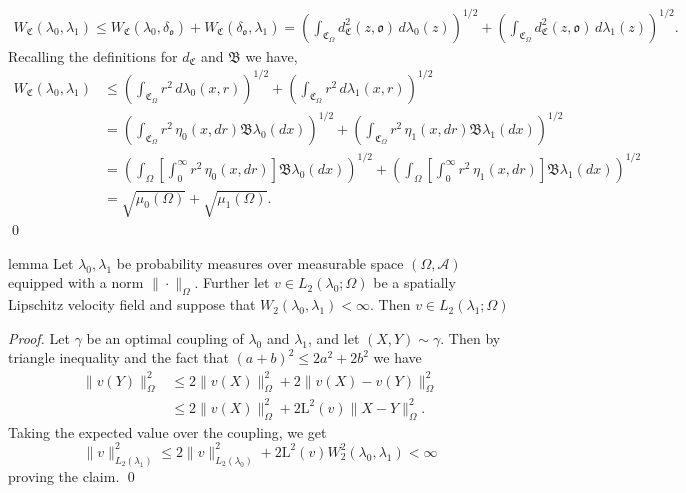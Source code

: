 \documentclass[11pt]{article}
\begin{document}
\begin{align*}
    W_\mathfrak{C}(\lambda_0, \lambda_1) \leq W_\mathfrak{C}(\lambda_0, \delta_\mathfrak{o}) + W_\mathfrak{C}(\delta_\mathfrak{o}, \lambda_1) = \left(\int_{\mathfrak{C}_\Omega}d_\mathfrak{C}^2(z, \mathfrak{o}) \, d\lambda_0(z)\right)^{1/2} + \left(\int_{\mathfrak{C}_\Omega}d^2_\mathfrak{C}(z, \mathfrak{o}) \, d\lambda_1(z)\right)^{1/2}.
\end{align*}
Recalling the definitions for $d_\mathfrak{C}$ and $\mathfrak{B}$ we have,
\begin{align*}
     W_\mathfrak{C}(\lambda_0, \lambda_1) &\leq \left(\int_{\mathfrak{C}_\Omega}r^2 \, d\lambda_0(x,r)\right)^{1/2} + \left(\int_{\mathfrak{C}_\Omega}r^2 \, d\lambda_1(x,r)\right)^{1/2} \\
     &= \left(\int_{\mathfrak{C}_\Omega}r^2 \,  \eta_0(x,dr)\mathfrak{B}\lambda_0(dx)\right)^{1/2} + \left(\int_{\mathfrak{C}_\Omega}r^2 \, \eta_1(x, dr)\mathfrak{B}\lambda_1(dx)\right)^{1/2} \\
     &= \left(\int_\Omega\left[\int_{0}^\infty r^2 \,  \eta_0(x,dr)\right]\mathfrak{B}\lambda_0(dx)\right)^{1/2} + \left(\int_\Omega\left[\int_{0}^\infty r^2 \,  \eta_1(x,dr)\right]\mathfrak{B}\lambda_1(dx)\right)^{1/2} \\
     &= \sqrt{\mu_0(\Omega)} + \sqrt{\mu_1(\Omega)}. 
\end{align*} \qed{}
\\
\begin{restatable}{lemma}{} \label{L2}
    Let $\lambda_0, \lambda_1$ be probability measures over measurable space $(\Omega, \mathcal{A})$ equipped with a norm $\|\cdot \|_\Omega$. Further let $v \in L_2(\lambda_0; \Omega)$ be a spatially Lipschitz velocity field and suppose that $W_2(\lambda_0, \lambda_1) < \infty$. Then $v \in L_2(\lambda_1; \Omega)$
\end{restatable}
\noindent \textit{Proof.} Let $\gamma$ be an optimal coupling of $\lambda_0$ and $\lambda_1$, and let $(X,Y) \sim \gamma$. Then by triangle inequality and the fact that $(a + b)^2 \leq 2a^2 + 2b^2$ we have
\begin{align*}
    \|v(Y)\|_\Omega^2  &\leq 2\|v(X)\|_\Omega^2 + 2\|v(X) - v(Y)\|_\Omega^2 \\
    &\leq 2\|v(X)\|_\Omega^2 + 2\text{L}^2(v)\|X - Y\|_\Omega^2.
\end{align*}
Taking the expected value over the coupling, we get
\[\|v\|_{L_2(\lambda_1)}^2 \leq 2\|v\|_{L_2(\lambda_0)}^2 + 2\text{L}^2(v)W^2_2(\lambda_0, \lambda_1) < \infty\]
proving the claim. 
\qed{}
\end{document}
